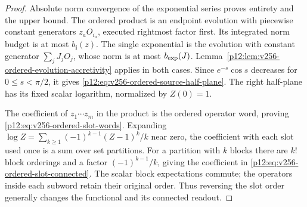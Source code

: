 \documentclass[12pt,a4paper]{article}
\begin{document}
\begin{proof}
Absolute norm convergence of the exponential series proves entirety and
the upper bound.  The ordered product is an endpoint evolution with
piecewise constant generators $z_aO_{i_a}$, executed rightmost factor
first.  Its integrated norm budget is at most $b_{\mathbf i}(z)$.
The single exponential is the evolution with constant generator
$\sum_jJ_jO_j$, whose norm is at most $b_{\rm exp}(J)$.
Lemma~\ref{p12:lem:v256-ordered-evolution-accretivity} applies in both
cases.  Since $e^{-s}\cos s$ decreases for $0\le s<\pi/2$, it gives
\eqref{p12:eq:v256-ordered-source-half-plane}.  The right half-plane
has its fixed scalar logarithm, normalized by $Z(0)=1$.

The coefficient of $z_1\cdots z_m$ in the product is the ordered
operator word, proving \eqref{p12:eq:v256-ordered-slot-words}.
Expanding $\log Z=\sum_{k\ge1}(-1)^{k-1}(Z-1)^k/k$ near zero,
the coefficient with each slot used once is a sum over set partitions.
For a partition with $k$ blocks there are $k!$ block orderings and a
factor $(-1)^{k-1}/k$, giving the coefficient in
\eqref{p12:eq:v256-ordered-slot-connected}.  The scalar block
expectations commute; the operators inside each subword retain their
original order.  Thus reversing the slot order generally changes the
functional and its connected readout.
\end{proof}
\end{document}
